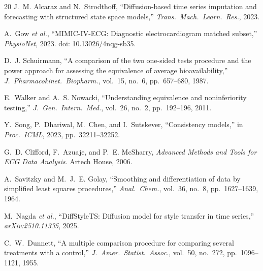 \documentclass[conference]{IEEEtran}
\begin{document}
\begin{thebibliography}{20}
J.~M. Alcaraz and N.~Strodthoff, ``Diffusion-based time series imputation and forecasting with structured state space models,'' \textit{Trans.\ Mach.\ Learn.\ Res.}, 2023.

A.~Gow \textit{et al.}, ``MIMIC-IV-ECG: Diagnostic electrocardiogram matched subset,'' \textit{PhysioNet}, 2023. doi: 10.13026/4nqg-sb35.

D.~J. Schuirmann, ``A comparison of the two one-sided tests procedure and the power approach for assessing the equivalence of average bioavailability,'' \textit{J.\ Pharmacokinet.\ Biopharm.}, vol.~15, no.~6, pp.~657--680, 1987.

E.~Walker and A.~S. Nowacki, ``Understanding equivalence and noninferiority testing,'' \textit{J.\ Gen.\ Intern.\ Med.}, vol.~26, no.~2, pp.~192--196, 2011.

Y.~Song, P.~Dhariwal, M.~Chen, and I.~Sutskever, ``Consistency models,'' in \textit{Proc.\ ICML}, 2023, pp.~32211--32252.

G.~D. Clifford, F.~Azuaje, and P.~E. McSharry, \textit{Advanced Methods and Tools for ECG Data Analysis}. Artech House, 2006.

A.~Savitzky and M.~J.~E. Golay, ``Smoothing and differentiation of data by simplified least squares procedures,'' \textit{Anal.\ Chem.}, vol.~36, no.~8, pp.~1627--1639, 1964.

M.~Nagda \textit{et al.}, ``DiffStyleTS: Diffusion model for style transfer in time series,'' \textit{arXiv:2510.11335}, 2025.

C.~W.~Dunnett, ``A multiple comparison procedure for comparing several treatments with a control,'' \textit{J.\ Amer.\ Statist.\ Assoc.}, vol.~50, no.~272, pp.~1096--1121, 1955.

\end{thebibliography}
\end{document}
